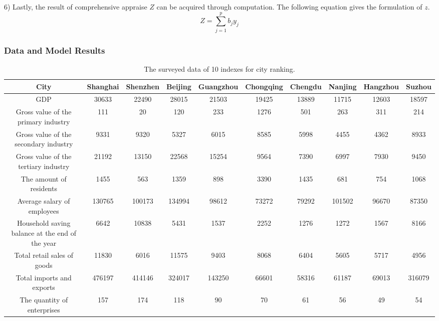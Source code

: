 \documentclass{apmcmthesis}
\begin{document}
6) Lastly, the result of comprehensive appraise $Z$ can be acquired through computation. The following equation gives the formulation of $z$.
\begin{equation}
Z=\sum\limits_{j=1}^{p}{{{b}_{j}}{{y}_{j}}}
\end{equation}
\subsubsection{Data and Model Results}
\begin{table}[h]
\tiny
\centering
\caption{The surveyed data of 10 indexes for city ranking.}
    \begin{tabular}{cccccccccc}
    \toprule
    City  & Shanghai & Shenzhen & Beijing & Guangzhou & Chongqing & Chengdu & Nanjing & Hangzhou & Suzhou  \\
    \midrule
    GDP & 30633  & 22490  & 28015  & 21503  & 19425  & 13889  & 11715  & 12603  & 18597   \\
    \midrule
    Gross value of the primary industry & 111   & 20    & 120   & 233   & 1276  & 501   & 263   & 311   & 214   \\
    \midrule
    Gross value of the secondary industry & 9331  & 9320  & 5327  & 6015  & 8585  & 5998  & 4455  & 4362  & 8933   \\
    \midrule
    Gross value of the tertiary industry & 21192  & 13150  & 22568  & 15254  & 9564  & 7390  & 6997  & 7930  & 9450   \\
    \midrule
    The amount of residents & 1455  & 563   & 1359  & 898   & 3390  & 1435  & 681   & 754   & 1068   \\
    \midrule
    Average salary of employees & 130765  & 100173  & 134994  & 98612  & 73272  & 79292  & 101502  & 96670  & 87350    \\
    \midrule
    Household saving balance at the end of the year & 6642  & 10838  & 5431  & 1537  & 2252  & 1276  & 1272  & 1567  & 8166   \\
    \midrule
    Total retail sales of goods & 11830  & 6016  & 11575  & 9403  & 8068  & 6404  & 5605  & 5717  & 4956    \\
    \midrule
    Total imports and exports & 476197  & 414146  & 324017  & 143250  & 66601  & 58316  & 61187  & 69013  & 316079    \\
    \midrule
    The quantity of enterprises & 157  & 174  & 118  & 90  & 70  & 61  & 56 & 49  & 54   \\
    \bottomrule
    \end{tabular}
  \label{data q3}
\end{table}
\end{document}
